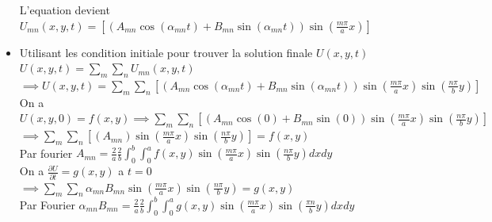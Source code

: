 \documentclass[12pt]{book}
\begin{document}
\begin{itemize}
                    \begin{center}
                    \end{center}
                    L'equation devient $U_{mn}(x,y,t) = \left[ (A_{mn}\cos(\alpha_{mn}t)+B_{mn}\sin(\alpha_{mn}t))\sin(\frac{m\pi}{a}x) \right]$
                \item Utilisant les condition initiale pour trouver la solution finale $U(x,y,t)$ \\
                    $U(x,y,t) = \sum_m\sum_nU_{mn}(x,y,t)$ \\
                    $ \implies U(x,y,t) = \sum_m\sum_n\left[ (A_{mn}\cos(\alpha_{mn}t)+B_{mn}\sin(\alpha_{mn}t))\sin(\frac{m\pi}{a}x)\sin(\frac{n\pi}{b}y) \right]$ \\
                    On a $ U(x,y,0)=f(x,y) \implies \sum_m\sum_n\left[ (A_{mn}\cos(0)+B_{mn}\sin(0))\sin(\frac{m\pi}{a}x)\sin(\frac{n\pi}{b}y)  \right] $ \\
                    $\implies \sum_m\sum_n\left[( A_{mn})\sin(\frac{m\pi}{a}x)\sin(\frac{n\pi}{b}y)  \right] =f(x,y)$ \\
                    Par fourier $A_{mn}=\frac{2}{a}\frac{2}{b}\int^b_0\int^a_0f(x,y)\sin(\frac{m\pi}{a}x)\sin(\frac{n\pi}{b}y)dxdy$ \\
                    On a $\frac{\partial U}{\partial t} = g(x,y)$ a $t =0 $ $\implies \sum_m\sum_n\alpha_{mn}B_{mn}\sin(\frac{m\pi}{a}x)\sin(\frac{n\pi}{b}y) = g(x,y)$\\
                    Par Fourier $ \alpha_{mn}B_{mn} = \frac{2}{a}\frac{2}{b}\int^b_0\int^a_0g(x,y)\sin(\frac{m\pi}{a}x)\sin(\frac{\pi n}{b}y)dxdy $
            \end{itemize}
        \pagebreak
\end{document}
